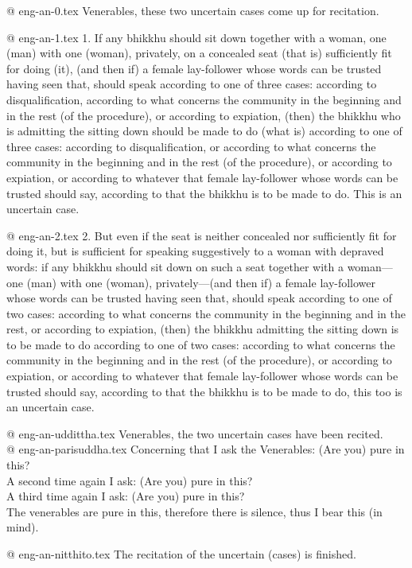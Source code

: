 @ eng-an-0.tex
Venerables, these two uncertain cases come up for recitation.

@ eng-an-1.tex
1. If any bhikkhu should sit down together with a woman, one (man) with one (woman), privately, on a concealed seat (that is) sufficiently fit for doing (it), (and then if) a female lay-follower whose words can be trusted having seen that, should speak according to one of three cases: according to disqualification, according to what concerns the community in the beginning and in the rest (of the procedure), or according to expiation, (then) the bhikkhu who is admitting the sitting down should be made to do (what is) according to one of three cases: according to disqualification, or according to what concerns the community in the beginning and in the rest (of the procedure), or according to expiation, or according to whatever that female lay-follower whose words can be trusted should say, according to that the bhikkhu is to be made to do. This is an uncertain case.

@ eng-an-2.tex
2. But even if the seat is neither concealed nor sufficiently fit for doing it, but is sufficient for speaking suggestively to a woman with depraved words: if any bhikkhu should sit down on such a seat together with a woman—one (man) with one (woman), privately—(and then if) a female lay-follower whose words can be trusted having seen that, should speak according to one of two cases: according to what concerns the community in the beginning and in the rest, or according to expiation, (then) the bhikkhu admitting the sitting down is to be made to do according to one of two cases: according to what concerns the community in the beginning and in the rest (of the procedure), or according to expiation, or according to whatever that female lay-follower whose words can be trusted should say, according to that the bhikkhu is to be made to do, this too is an uncertain case.

@ eng-an-uddittha.tex
Venerables, the two uncertain cases have been recited.\\

@ eng-an-parisuddha.tex
Concerning that I ask the Venerables: (Are you) pure in this?\\
A second time again I ask: (Are you) pure in this?\\
A third time again I ask: (Are you) pure in this?\\
The venerables are pure in this, therefore there is silence, thus I bear this (in mind).

@ eng-an-nitthito.tex
The recitation of the uncertain (cases) is finished.
